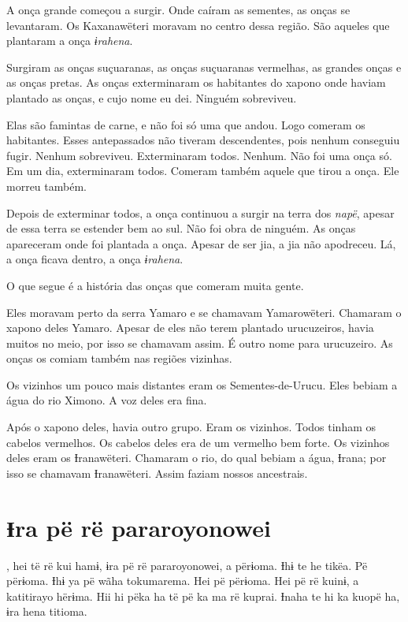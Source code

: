 A onça grande começou a surgir. Onde caíram as sementes, as onças se
levantaram. Os Kaxanawëteri moravam no centro dessa região. São aqueles
que plantaram a onça \textit{ɨrahena}. 

Surgiram as onças suçuaranas, as onças suçuaranas vermelhas, as grandes
onças e as onças pretas. As onças exterminaram os habitantes do xapono
onde haviam plantado as onças, e cujo nome eu dei. Ninguém sobreviveu. 

Elas são famintas de carne, e não foi só uma que andou. Logo comeram os
habitantes. Esses antepassados não tiveram descendentes, pois nenhum
conseguiu fugir. Nenhum sobreviveu. Exterminaram todos. Nenhum. Não foi uma onça só. Em um dia, exterminaram todos. Comeram também aquele que tirou
a onça. Ele morreu também. 

Depois de exterminar todos, a onça continuou a surgir na terra
dos \textit{napë}, apesar de essa terra se estender bem ao sul. Não foi obra
de ninguém. As onças apareceram onde foi plantada a onça. Apesar de ser
jia, a jia não apodreceu. Lá, a onça ficava dentro, a
onça \textit{ɨrahena}. 

O que segue é a história das onças que comeram muita gente. 

Eles moravam perto da serra Yamaro e se chamavam Yamarowëteri. Chamaram
o xapono deles Yamaro. Apesar de eles não terem plantado urucuzeiros,
havia muitos no meio, por isso se chamavam assim. É outro nome para
urucuzeiro. As onças os comiam também nas regiões vizinhas. 

Os vizinhos um pouco mais distantes eram os Sementes-de-Urucu. Eles
bebiam a água do rio Ximono. A voz deles era fina. 

Após o xapono deles, havia outro grupo. Eram os vizinhos. Todos tinham
os cabelos vermelhos. Os cabelos deles era de um vermelho bem forte. Os
vizinhos deles eram os Ɨranawëteri. Chamaram o rio, do qual bebiam a
água, Ɨrana; por isso se chamavam Ɨranawëteri. Assim faziam nossos
ancestrais.

\chapter{Ɨra pë rë pararoyonowei}
 
, hei të rë kui hamɨ, ɨra pë rë pararoyonowei, a përɨoma. Ɨhɨ te
he tikëa. Pë përɨoma. Ɨhɨ ya pë wãha tokumarema. Hei pë përɨoma. Hei pë
rë kuinɨ, a katitirayo hërɨma. Hii hi pëka ha të pë ka ma rë kuprai.
Ɨnaha te hi ka kuopë ha, ɨra hena titioma. 

